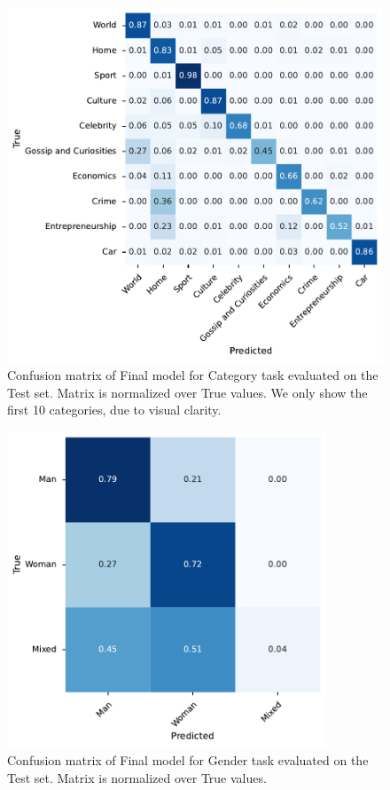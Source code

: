 \begin{figure}
    \centering
    \includegraphics[width=1.0\textwidth]{img/conf_matrix/category_test_confusion_matrix.pdf}
    \caption{Confusion matrix of Final model for Category task evaluated on the Test set. Matrix is normalized over True values.
    We only show the first 10 categories, due to visual clarity.}
    \label{fig:category-conf}
\end{figure}
\begin{figure}
    \centering
    \includegraphics[width=0.85\textwidth]{img/conf_matrix/authors_cum_gender_test_confusion_matrix.pdf}
    \caption{Confusion matrix of Final model for Gender task evaluated on the Test set. Matrix is normalized over True values.}
    \label{fig:gender-conf}
\end{figure}
